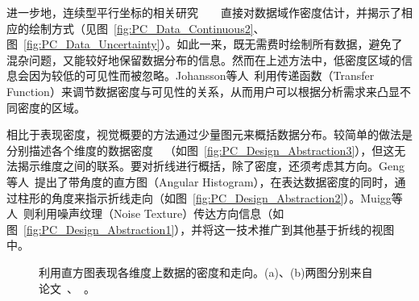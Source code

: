 \documentclass[12pt,twocolumn]{article}
\begin{document}
进一步地，连续型平行坐标的相关研究~\citep{heinrich2009continuous}~\citep{lehmann2011features}~\citep{feng2010matching}~\citep{heinrich2011progressive}直接对数据域作密度估计，并揭示了相应的绘制方式（见图~\ref{fig:PC_Data_Continuous2}、图~\ref{fig:PC_Data_Uncertainty}）。如此一来，既无需费时绘制所有数据，避免了混杂问题，又能较好地保留数据分布的信息。然而在上述方法中，低密度区域的信息会因为较低的可见性而被忽略。Johansson等人~\citep{johansson2005revealing}利用传递函数（Transfer Function）来调节数据密度与可见性的关系，从而用户可以根据分析需求来凸显不同密度的区域。

相比于表现密度，视觉概要的方法通过少量图元来概括数据分布。较简单的做法是分别描述各个维度的数据密度~\citep{hauser2002angular}~\citep{caat2007design}（如图~\ref{fig:PC_Design_Abstraction3}），但这无法揭示维度之间的联系。要对折线进行概括，除了密度，还须考虑其方向。Geng等人~\citep{geng2011angular}提出了带角度的直方图（Angular Histogram），在表达数据密度的同时，通过柱形的角度来指示折线走向（如图~\ref{fig:PC_Design_Abstraction2}）。Muigg等人~\citep{muigg2011visual}则利用噪声纹理（Noise Texture）传达方向信息（如图~\ref{fig:PC_Design_Abstraction1}），并将这一技术推广到其他基于折线的视图中。

\begin{figure}[!htb]
\centering
{}
\caption{利用直方图表现各维度上数据的密度和走向。(a)、(b)两图分别来自论文~\citep{hauser2002angular}、~\citep{geng2011angular}。}
\end{figure}
\end{document}
